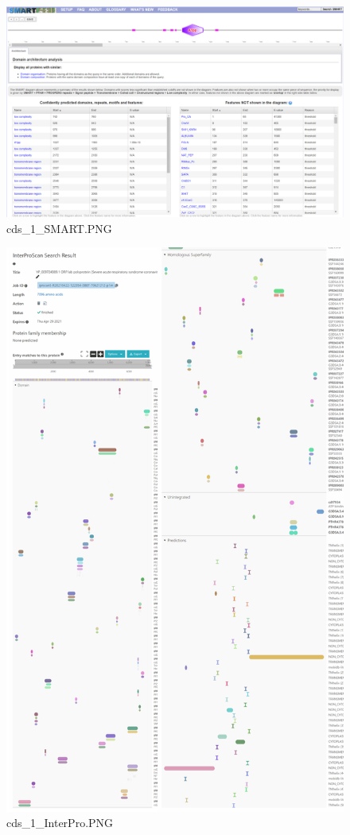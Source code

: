 \documentclass[supercite]{HustGraduPaper}
\begin{document}
	\begin{figure}[H]
		\centering
		\includegraphics[width=1\textwidth]{./material/practice2/cds_1/SMART.png}
		\caption{cds\_1\_SMART.PNG}
	\end{figure}
	\begin{figure}[H]
		\centering
		\includegraphics[width=1\textwidth]{./material/practice2/cds_1/InterPro.png}
		\caption{cds\_1\_InterPro.PNG}
	\end{figure}
\end{document}
